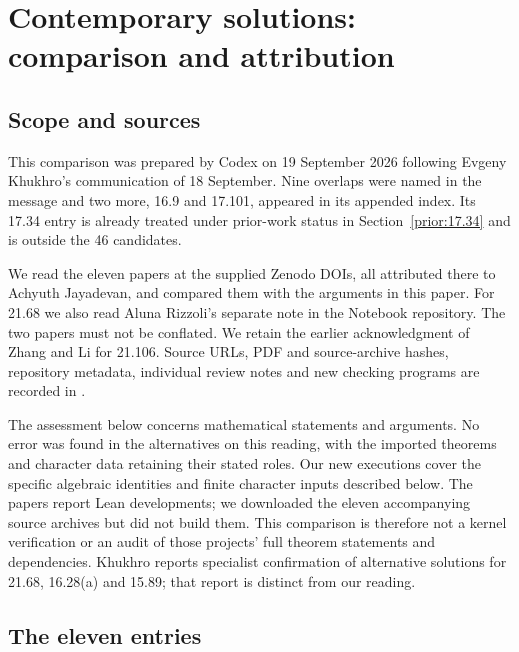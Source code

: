 \clearpage
\section{Contemporary solutions: comparison and attribution}
\label{app:contemporary-comparison}

\subsection{Scope and sources}

This comparison was prepared by Codex on 19 September 2026 following
Evgeny Khukhro's communication of 18 September. Nine overlaps were
named in the message and two more, 16.9 and 17.101, appeared in its
appended index. Its 17.34 entry is already treated under prior-work
status in Section~\ref{prior:17.34} and is outside the 46 candidates.

We read the eleven papers at the supplied Zenodo DOIs, all attributed
there to Achyuth Jayadevan, and compared them with the arguments in
this paper. For 21.68 we also read Aluna Rizzoli's separate note in the
Notebook repository. The two papers must not be conflated. We retain
the earlier acknowledgment of Zhang and Li for 21.106. Source URLs,
PDF and source-archive hashes, repository metadata, individual review
notes and new checking programs are recorded in
.

The assessment below concerns mathematical statements and arguments.
No error was found in the alternatives on this reading, with the
imported theorems and character data retaining their stated roles.
Our new executions cover the specific algebraic identities and finite
character inputs described below. The papers report Lean developments;
we downloaded the eleven accompanying source archives but did not
build them. This comparison is therefore not a kernel verification or
an audit of those projects' full theorem statements and dependencies.
Khukhro reports specialist confirmation of alternative solutions for
21.68, 16.28(a) and 15.89; that report is distinct from our reading.

\subsection{The eleven entries}


